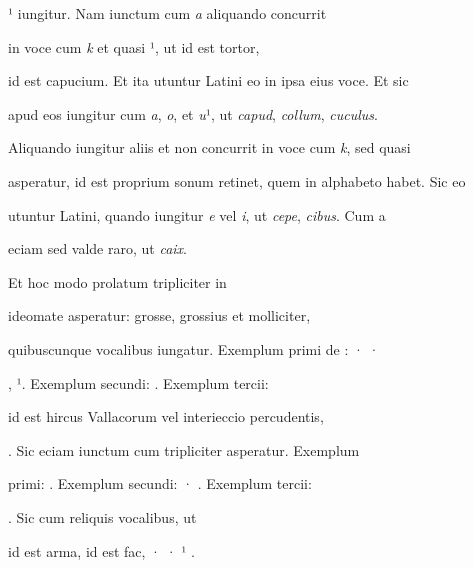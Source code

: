 ¹ iungitur. Nam iunctum cum \textit{a} aliquando concurrit

in voce cum \textit{k} et quasi ¹, ut  id est tortor, 


id est capucium. Et ita utuntur Latini eo in ipsa eius voce. Et sic

apud eos iungitur cum \textit{a}, \textit{o}, et \textit{u}¹, ut \textit{capud}, \textit{collum}, \textit{cuculus}.

Aliquando iungitur aliis et non concurrit in voce cum \textit{k}, sed quasi

asperatur, id est proprium sonum retinet, quem in alphabeto habet. Sic eo

utuntur Latini, quando iungitur \textit{e} vel \textit{i}, ut \textit{cepe}, \textit{cibus}. Cum a

\splitlines
eciam sed valde raro, ut \textit{caix}.

\indentK Et hoc modo prolatum tripliciter in 

\fulllines

 ideomate asperatur: grosse, grossius et molliciter,

quibuscunque vocalibus iungatur. Exemplum primi de : · ·

, ¹. Exemplum secundi:   . Exemplum tercii:

  id est hircus Vallacorum vel interieccio percudentis,

 . Sic eciam iunctum cum  tripliciter asperatur. Exemplum

primi:  . Exemplum secundi: · . Exemplum tercii:

 . Sic cum reliquis vocalibus, ut  

 id est arma,  id est fac, · · ¹ .


